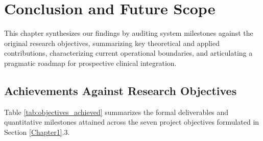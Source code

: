 
\chapter{Conclusion and Future Scope}
\label{Chapter7}

This chapter synthesizes our findings by auditing system milestones against the original research objectives, summarizing key theoretical and applied contributions, characterizing current operational boundaries, and articulating a pragmatic roadmap for prospective clinical integration.


\section{Achievements Against Research Objectives}

Table \ref{tab:objectives_achieved} summarizes the formal deliverables and quantitative milestones attained across the seven project objectives formulated in Section \ref{Chapter1}.3.


